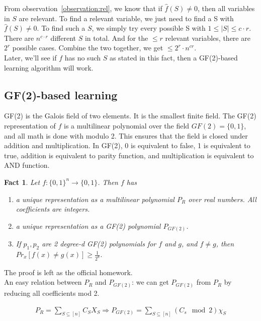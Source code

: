 \documentclass[12pt]{article}
\newtheorem{fact}[theorem]{Fact}
\begin{document}
From observation~\ref{observation:rel}, we know that if $\hat {f}(S)
\neq 0$, then all variables in $S$ are relevant. To find a relevant
variable, we just need to find a S with $\hat {f}(S) \neq 0$. To find
such a $S$, we simply try every possible S with $1 \le |S| \le c \cdot
r$. There are $n^{c \cdot r}$ different $S$ in total. And for the $\le
r$ relevant variables, there are $2^r$ possible cases. Combine the two
together, we get $\le 2^r \cdot n^{cr}$. \\

Later, we'll see if $f$ has no such $S$ as stated in this fact, then
a GF(2)-based learning algorithm will work.

\subsection{GF(2)-based learning}

GF(2) is the Galois field of two elements. It is the smallest finite
field. The GF(2) representation of $f$ is a multilinear polynomial
over the field $GF(2) = \{ 0, 1 \}$, and all math is done with modulo
2. This ensures that the field is closed under addition and 
multiplication. In GF(2), 0 is equivalent to false, 1 is equivalent to
true, addition is equivalent to parity function, and multiplication is
equivalent to AND function. \\

\begin{fact}
Let $f: \{ 0, 1 \}^n \rightarrow \{ 0, 1\}$. Then $f$ has
\begin{enumerate}
\item a unique representation as a multilinear polynomial $P_R$ over
  real numbers. All coefficients are integers.
\item a unique representation as a GF(2) polynomial $P_{GF(2)}$.
\item If $p_1, p_2$ are 2 degree-d GF(2) polynomials for $f$ and $g$,
  and $f \neq g$, then $Pr_x [ f(x) \neq g(x) ] \ge \frac
  {1}{2^d}$.
\end{enumerate}

\end{fact}

The proof is left as the official homework. \\

An easy relation between $P_R$ and $P_{GF(2)}$: we can get $P_{GF(2)}$
from $P_R$ by reducing all coefficients mod 2.

\begin{eqnarray*}
P_R = \sum_{S \subseteq [n]}
{C_S X_S}
\Rightarrow P_{GF(2)} = \sum_{S \subseteq [n]} (C_s \mod 2) \chi_S
\end{eqnarray*}
\end{document}
